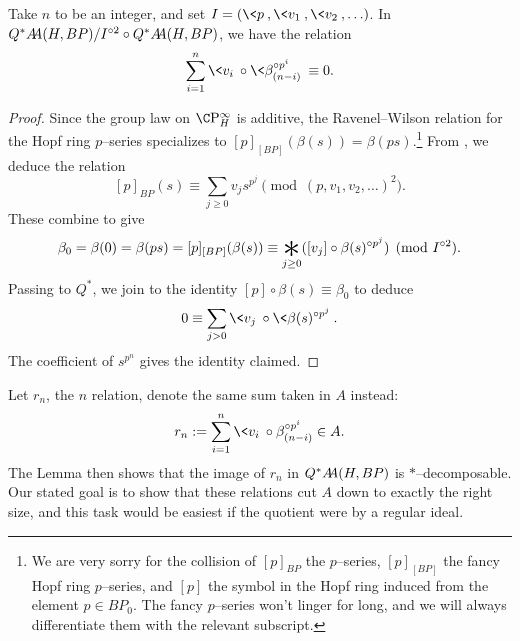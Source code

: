 \begin{lemma}
Take \(n\) to be an integer, and set \(I = (\<p\>, \<v_1\>, \<v_2\>, \ldots)\).  In \(Q^* \AA(H, BP) / I^{\circ 2} \circ Q^* \AA(H, BP)\), we have the relation \[\sum_{i=1}^n \<v_i\> \circ \<\beta_{(n-i)}^{\circ p^i}\> \equiv 0.\]
\end{lemma}
\begin{proof}
Since the group law on \(\CP^\infty_H\) is additive, the Ravenel--Wilson relation for the Hopf ring \(p\)--series specializes to \([p]_{[BP]}(\beta(s)) = \beta(ps)\).\footnote{We are very sorry for the collision of \([p]_{BP}\) the \(p\)--series, \([p]_{[BP]}\) the fancy Hopf ring \(p\)--series, and \([p]\) the symbol in the Hopf ring induced from the element \(p \in BP_0\).  The fancy \(p\)--series won't linger for long, and we will always differentiate them with the relevant subscript.}  From , we deduce the relation \[[p]_{BP}(s) \equiv \sum_{j \ge 0} v_j s^{p^j} \pmod{(p, v_1, v_2, \ldots)^2}.\]  These combine to give \[\beta_0 = \beta(0) = \beta(ps) = [p]_{[BP]}(\beta(s)) \equiv \bigast_{j \ge 0} ([v_j] \circ \beta(s)^{\circ p^j}) \pmod{I^{\circ 2}}.\]  Passing to \(Q^*\), we join  to the identity \([p] \circ \beta(s) \equiv \beta_0\) to deduce \[0 \equiv \sum_{j > 0} \<v_j\> \circ \<\beta(s)^{\circ p^j}\>.\]  The coefficient of \(s^{p^n}\) gives the identity claimed.
\end{proof}

Let \(r_n\), the \(n\){\th} relation, denote the same sum taken in \(A\) instead: \[r_n := \sum_{i=1}^n \<v_i\> \circ \beta_{(n-i)}^{\circ p^i} \in A.\]  The Lemma then shows that the image of \(r_n\) in \(Q^* \AA(H, BP)\) is \(\ast\)--decomposable.  Our stated goal is to show that these relations cut \(A\) down to exactly the right size, and this task would be easiest if the quotient were by a regular ideal.

